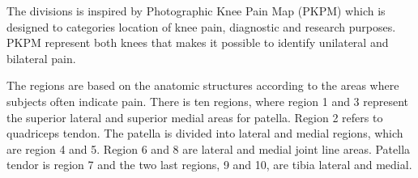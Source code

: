 \noindent
The divisions is inspired by Photographic Knee Pain Map (PKPM) which is designed to categories location of knee pain, diagnostic and research purposes. PKPM represent both knees that makes it possible to identify unilateral and bilateral pain.\citep{Elson2010}

\noindent
The regions are based on the anatomic structures according to the areas where subjects often indicate pain.
There is ten regions, where region 1 and 3 represent the superior lateral and superior medial areas for patella. Region 2 refers to quadriceps tendon. The patella is divided into lateral and medial regions, which are region 4 and 5. Region 6 and 8 are lateral and medial joint line areas. Patella tendor is region 7 and the two last regions, 9 and 10, are tibia lateral and medial.\citep{Elson2010}

\newpage
